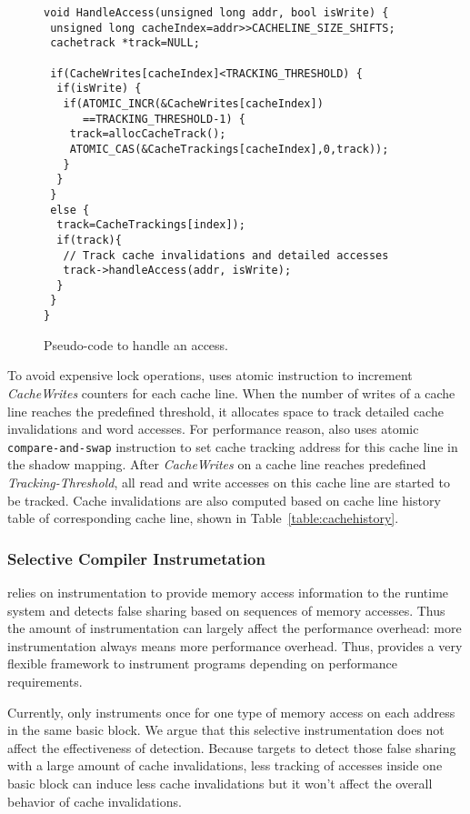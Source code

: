 \begin{figure}[!t]
\begin{lstlisting}
void HandleAccess(unsigned long addr, bool isWrite) {
 unsigned long cacheIndex=addr>>CACHELINE_SIZE_SHIFTS;
 cachetrack *track=NULL;

 if(CacheWrites[cacheIndex]<TRACKING_THRESHOLD) {
  if(isWrite) {
   if(ATOMIC_INCR(&CacheWrites[cacheIndex]) 
      ==TRACKING_THRESHOLD-1) {
    track=allocCacheTrack();
    ATOMIC_CAS(&CacheTrackings[cacheIndex],0,track));
   }
  } 
 }
 else {
  track=CacheTrackings[index]);
  if(track){
   // Track cache invalidations and detailed accesses
   track->handleAccess(addr, isWrite);
  }
 }
}
\end{lstlisting}
\caption{Pseudo-code to handle an access.\label{fig:algorithm}}
\end{figure}

To avoid expensive lock operations, \Predator{} uses atomic instruction to increment 
{\it CacheWrites} counters for each cache line. 
When the number of writes of a cache line reaches the predefined threshold,
it allocates space to track detailed cache invalidations and word accesses.
For performance reason, \Predator{} also 
uses atomic \texttt{compare-and-swap} instruction to set cache tracking address for this cache line in
the shadow mapping.
After {\it CacheWrites} on a cache line reaches predefined {\it Tracking-Threshold}, 
all read and write accesses on this cache line are started to be tracked.
Cache invalidations are also computed based on cache line history table of corresponding
cache line, shown in Table~\ref{table:cachehistory}. 


\subsubsection{Selective Compiler Instrumetation}
\Predator{} relies on instrumentation to provide memory access information to the runtime system 
and detects false sharing based on sequences of memory accesses. 
Thus the amount of instrumentation can largely affect the performance overhead: more 
instrumentation always means more performance overhead. 
Thus, \Predator{} provides a very flexible framework to instrument programs 
depending on performance requirements. 

Currently, \Predator{} only instruments once for one type of memory access on each address 
in the same basic block. 
We argue that this selective instrumentation does not affect the effectiveness of detection. 
Because \Predator{} targets to detect those false sharing with a large amount of cache invalidations,
less tracking of accesses inside one basic block can induce less cache invalidations 
but it won't affect the overall behavior of cache invalidations. 


